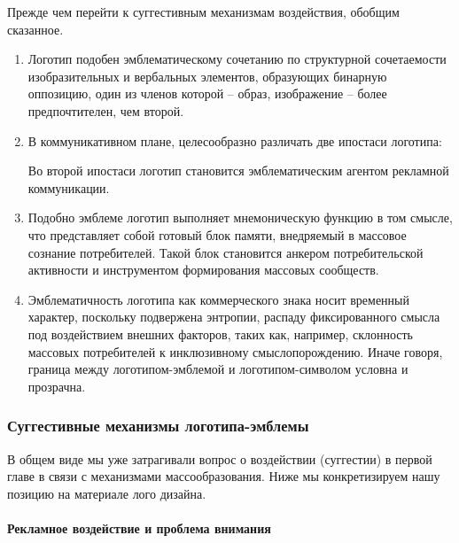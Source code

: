Прежде чем перейти к  суггестивным механизмам воздействия, обобщим сказанное.
\begin{enumerate}
\item Логотип подобен эмблематическому сочетанию по структурной сочетаемости
  изобразительных и вербальных элементов, образующих бинарную оппозицию,
  один из членов которой -- образ, изображение -- более предпочтителен, чем второй.
\item В коммуникативном плане, целесообразно различать две ипостаси логотипа:
  Во второй ипостаси логотип становится эмблематическим агентом рекламной
  коммуникации.
\item Подобно эмблеме логотип выполняет мнемоническую функцию в том смысле,
  что представляет собой  готовый блок памяти, внедряемый в массовое сознание
  потребителей. Такой блок становится анкером потребительской активности и
  инструментом формирования массовых сообществ.
\item Эмблематичность логотипа как коммерческого знака носит временный
  характер, поскольку подвержена энтропии, распаду фиксированного смысла под
  воздействием внешних факторов, таких как, например, склонность массовых
  потребителей к инклюзивному смыслопорождению. Иначе говоря, граница между
  логотипом-эмблемой и логотипом-символом условна и прозрачна.
\end{enumerate}

\subsubsection{Суггестивные механизмы логотипа-эмблемы}

В общем виде мы уже затрагивали вопрос о воздействии (суггестии) в первой главе
в связи с механизмами массообразования. Ниже мы конкретизируем нашу позицию
на материале лого дизайна.

\paragraph{Рекламное воздействие и  проблема внимания}

